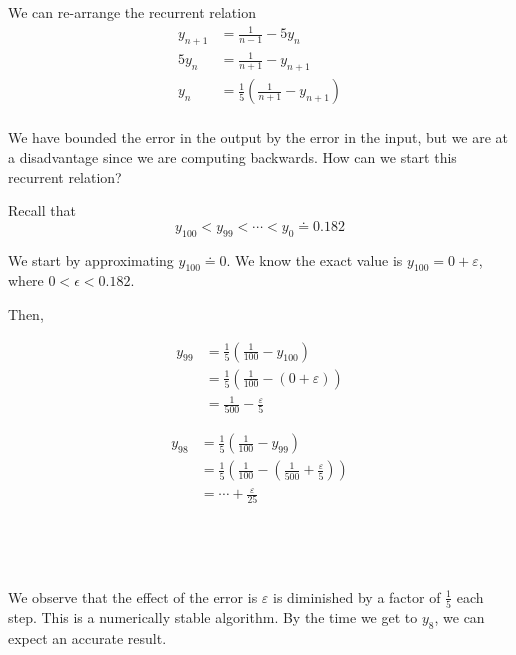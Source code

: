 \begin{example}[Cont.]
    We can re-arrange the recurrent relation
    \begin{align*}
        y_{n+1}
         & = \frac{1}{n-1} - 5y_n                               \\
        5y_n
         & = \frac{1}{n+1} - y_{n+1}                            \\
        y_n
         & = \frac{1}{5} \left( \frac{1}{n+1} - y_{n+1} \right) \\
    \end{align*}

    We have bounded the error in the output by the error in the input, but we are at a disadvantage since we are computing backwards. How can we start this recurrent relation?

    Recall that \[
        y_{100} < y_{99} < \cdots < y_0 \doteq 0.182
    \]

    We start by approximating \( y_{100} \doteq 0 \). We know the exact value is \( y_{100} = 0 + \varepsilon \), where \( 0 < \epsilon < 0.182 \).

    Then,
    \begin{minipage}[t]{0.45\linewidth}
        \begin{align*}
            y_{99}
             & = \frac{1}{5} \left( \frac{1}{100} - y_{100} \right)            \\
             & = \frac{1}{5} \left( \frac{1}{100} - (0 + \varepsilon ) \right) \\
             & = \frac{1}{500} - \frac{\varepsilon}{5}
        \end{align*}
    \end{minipage}
    \begin{minipage}[t]{0.45\linewidth}
        \begin{align*}
            y_{98}
             & = \frac{1}{5} \left( \frac{1}{100} - y_{99} \right)                                              \\
             & = \frac{1}{5} \left( \frac{1}{100} - \left(\frac{1}{500} + \frac{\varepsilon}{5} \right) \right) \\
             & = \cdots + \frac{\varepsilon}{25}
        \end{align*}
    \end{minipage}

    {~~~}

    {~~~}

    We observe that the effect of the error is \( \varepsilon \) is diminished by a factor of \( \frac{1}{5} \) each step. This is a numerically stable algorithm. By the time we get to \( y_8 \), we can expect an accurate result.
\end{example}

